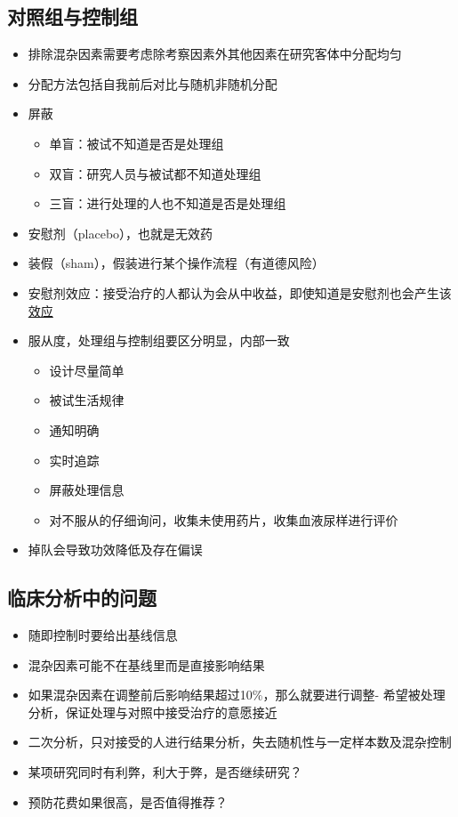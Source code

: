 \documentclass[]{book}
\providecommand{\tightlist}{%
  \setlength{\itemsep}{0pt}\setlength{\parskip}{0pt}}
\begin{document}
\subsection{对照组与控制组}

\begin{itemize}
\tightlist
\item
  排除混杂因素需要考虑除考察因素外其他因素在研究客体中分配均匀
\item
  分配方法包括自我前后对比与随机非随机分配
\item
  屏蔽

  \begin{itemize}
  \tightlist
  \item
    单盲：被试不知道是否是处理组
  \item
    双盲：研究人员与被试都不知道处理组
  \item
    三盲：进行处理的人也不知道是否是处理组
  \end{itemize}
\item
  安慰剂（placebo），也就是无效药
\item
  装假（sham），假装进行某个操作流程（有道德风险）
\item
  安慰剂效应：接受治疗的人都认为会从中收益，即使知道是安慰剂也会产生该\href{http://journals.plos.org/plosone/article?id=10.1371/journal.pone.0015591}{效应}
\item
  服从度，处理组与控制组要区分明显，内部一致

  \begin{itemize}
  \tightlist
  \item
    设计尽量简单
  \item
    被试生活规律
  \item
    通知明确
  \item
    实时追踪
  \item
    屏蔽处理信息
  \item
    对不服从的仔细询问，收集未使用药片，收集血液尿样进行评价
  \end{itemize}
\item
  掉队会导致功效降低及存在偏误
\end{itemize}

\subsection{临床分析中的问题}

\begin{itemize}
\tightlist
\item
  随即控制时要给出基线信息
\item
  混杂因素可能不在基线里而是直接影响结果
\item
  如果混杂因素在调整前后影响结果超过10\%，那么就要进行调整- 希望被处理分析，保证处理与对照中接受治疗的意愿接近
\item
  二次分析，只对接受的人进行结果分析，失去随机性与一定样本数及混杂控制
\item
  某项研究同时有利弊，利大于弊，是否继续研究？
\item
  预防花费如果很高，是否值得推荐？
\end{itemize}
\end{document}
